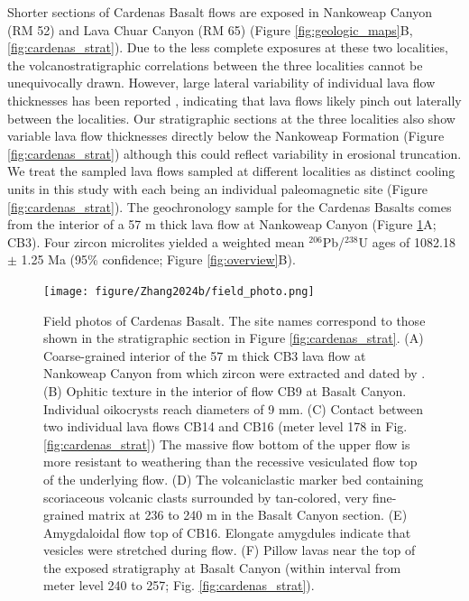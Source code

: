 Shorter sections of Cardenas Basalt flows are exposed in Nankoweap Canyon (RM 52) and Lava Chuar Canyon (RM 65) (Figure \ref{fig:geologic_maps}B, \ref{fig:cardenas_strat}). Due to the less complete exposures at these two localities, the volcanostratigraphic correlations between the three localities cannot be unequivocally drawn. However, large lateral variability of individual lava flow thicknesses has been reported \cite{Lucchitta1983a}, indicating that lava flows likely pinch out laterally between the localities. Our stratigraphic sections at the three localities also show variable lava flow thicknesses directly below the Nankoweap Formation (Figure \ref{fig:cardenas_strat}) although this could reflect variability in erosional truncation. We treat the sampled lava flows sampled at different localities as distinct cooling units in this study with each being an individual paleomagnetic site (Figure \ref{fig:cardenas_strat}). The  geochronology sample for the Cardenas Basalts comes from the interior of a 57 m thick lava flow at Nankoweap Canyon (Figure \ref{fig:field_photo}A; CB3). Four zircon microlites yielded a weighted mean $^{206}$Pb/$^{238}$U ages of 1082.18 $\pm$ 1.25 Ma (95\% confidence; Figure \ref{fig:overview}B). 

\begin{figure}[h!]
\centering
\texttt{[image: figure/Zhang2024b/field\_photo.png]}
\caption{Field photos of Cardenas Basalt. The site names correspond to those shown in the stratigraphic section in Figure \ref{fig:cardenas_strat}. (A) Coarse-grained interior of the 57 m thick CB3 lava flow at Nankoweap Canyon from which zircon were extracted and dated by . (B) Ophitic texture in the interior of flow CB9 at Basalt Canyon. Individual oikocrysts reach diameters of 9 mm. (C) Contact between two individual lava flows CB14 and CB16 (meter level 178 in Fig. \ref{fig:cardenas_strat}) The massive flow bottom of the upper flow is more resistant to weathering than the recessive vesiculated flow top of the underlying flow. (D) The volcaniclastic marker bed containing scoriaceous volcanic clasts surrounded by tan-colored, very fine-grained matrix at 236 to 240 m in the Basalt Canyon section. (E) Amygdaloidal flow top of CB16. Elongate amygdules indicate that vesicles were stretched during flow. (F) Pillow lavas near the top of the exposed stratigraphy at Basalt Canyon (within interval from meter level 240 to 257; Fig. \ref{fig:cardenas_strat}). }
\label{fig:field_photo}
\end{figure}

